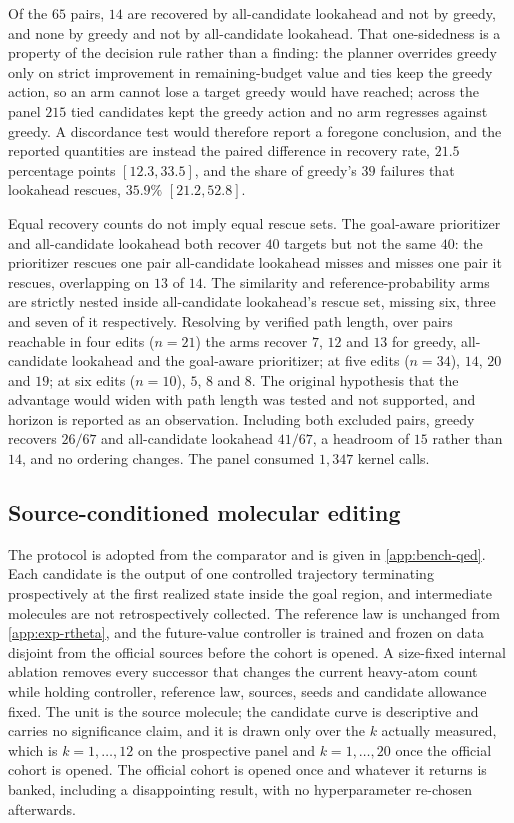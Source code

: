 Of the $65$ pairs, $14$ are recovered by all-candidate lookahead and not by greedy, and none by greedy and not by all-candidate lookahead. That one-sidedness is a property of the decision rule rather than a finding: the planner overrides greedy only on strict improvement in remaining-budget value and ties keep the greedy action, so an arm cannot lose a target greedy would have reached; across the panel $215$ tied candidates kept the greedy action and no arm regresses against greedy. A discordance test would therefore report a foregone conclusion, and the reported quantities are instead the paired difference in recovery rate, $21.5$ percentage points $[12.3,33.5]$, and the share of greedy's $39$ failures that lookahead rescues, $35.9\%$ $[21.2,52.8]$.

Equal recovery counts do not imply equal rescue sets. The goal-aware prioritizer and all-candidate lookahead both recover $40$ targets but not the same $40$: the prioritizer rescues one pair all-candidate lookahead misses and misses one pair it rescues, overlapping on $13$ of $14$. The similarity and reference-probability arms are strictly nested inside all-candidate lookahead's rescue set, missing six, three and seven of it respectively. Resolving by verified path length, over pairs reachable in four edits ($n=21$) the arms recover $7$, $12$ and $13$ for greedy, all-candidate lookahead and the goal-aware prioritizer; at five edits ($n=34$), $14$, $20$ and $19$; at six edits ($n=10$), $5$, $8$ and $8$. The original hypothesis that the advantage would widen with path length was tested and not supported, and horizon is reported as an observation. Including both excluded pairs, greedy recovers $26/67$ and all-candidate lookahead $41/67$, a headroom of $15$ rather than $14$, and no ordering changes. The panel consumed $1{,}347$ kernel calls.

\subsection{Source-conditioned molecular editing}
\label{app:exp-jin}

The protocol is adopted from the comparator and is given in \cref{app:bench-qed}. Each \method{} candidate is the output of one controlled trajectory terminating prospectively at the first realized state inside the goal region, and intermediate molecules are not retrospectively collected. The reference law is unchanged from \cref{app:exp-rtheta}, and the future-value controller is trained and frozen on data disjoint from the official sources before the cohort is opened. A size-fixed internal ablation removes every successor that changes the current heavy-atom count while holding controller, reference law, sources, seeds and candidate allowance fixed. The unit is the source molecule; the candidate curve is descriptive and carries no significance claim, and it is drawn only over the $k$ actually measured, which is $k=1,\dots,12$ on the prospective panel and $k=1,\dots,20$ once the official cohort is opened. The official cohort is opened once and whatever it returns is banked, including a disappointing result, with no hyperparameter re-chosen afterwards.

